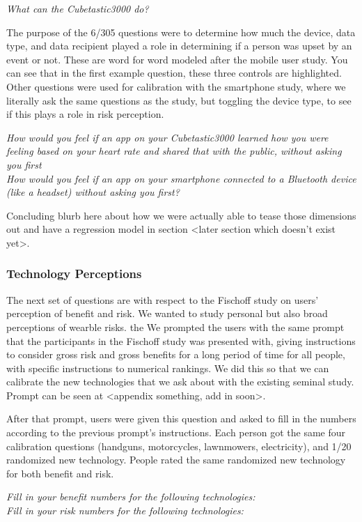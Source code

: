 \documentclass{acm_proc_article-sp}
\begin{document}
\textit{What can the Cubetastic3000 do?} 


The purpose of the 6/305 questions were to determine how much the device, data type, and data recipient played a role in determining if a person was upset by an event or not. These are word for word modeled after the mobile user study. You can see that in the first example question, these three controls are highlighted. Other questions were used for calibration with the smartphone study, where we literally ask the same questions as the study, but toggling the device type, to see if this plays a role in risk perception.

\textit{How would you feel if an app on your Cubetastic3000 learned how you were feeling based on your heart rate and shared that with the public, without asking you first}\\[-.5cm]

\textit{How would you feel if an app on your smartphone connected to a Bluetooth device (like a headset) without asking you first?} 

Concluding blurb here about how we were actually able to tease those dimensions out and have a regression model in section <later section which doesn't exist yet>.  

\subsubsection{Technology Perceptions}
The next set of questions are with respect to the Fischoff study on users’ perception of benefit and risk. We wanted to study personal but also broad perceptions of wearble risks. the We prompted the users with the same prompt that the participants in the Fischoff study was presented with, giving instructions to consider gross risk and gross benefits for a long period of time for all people, with specific instructions to numerical rankings. We did this so that we can calibrate the new technologies that we ask about with the existing seminal study. Prompt can be seen at <appendix something, add in soon>. 

After that prompt, users were given this question and asked to fill in the numbers according to the previous prompt’s instructions. Each person got the same four calibration questions (handguns, motorcycles, lawnmowers, electricity), and 1/20 randomized new technology.  People rated the same randomized new technology for both benefit and risk.

\textit{Fill in your benefit numbers for the following technologies:}\\
\textit{Fill in your risk numbers for the following technologies:}
\end{document}
